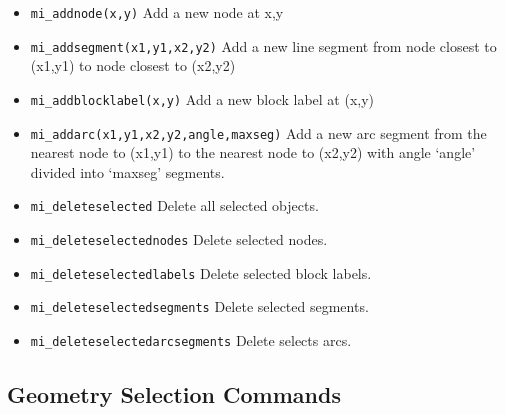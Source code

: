 \begin{itemize}

\item{\tt mi\_addnode(x,y)} Add a new node at x,y

\item{\tt mi\_addsegment(x1,y1,x2,y2)} Add a new line segment from node
closest to (x1,y1) to node closest to (x2,y2)

\item{\tt mi\_addblocklabel(x,y)} Add a new block label at (x,y)

\item{\tt mi\_addarc(x1,y1,x2,y2,angle,maxseg)} Add a new arc segment
from the nearest node to (x1,y1) to the nearest node to (x2,y2)
with angle `angle' divided into `maxseg' segments.

\item{\tt mi\_deleteselected} Delete all selected objects.

\item{\tt mi\_deleteselectednodes} Delete selected nodes.

\item{\tt mi\_deleteselectedlabels} Delete selected block labels.

\item{\tt mi\_deleteselectedsegments} Delete selected segments.

\item{\tt mi\_deleteselectedarcsegments} Delete selects arcs.
\end{itemize}

\subsection{Geometry Selection Commands}

